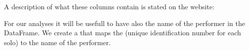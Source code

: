\documentclass[letterpaper,10pt,english]{sphinxmanual}
\begin{document}
A description of what these columns contain is stated on the website: 

For our analyses it will be usefull to have also the name of the performer in the  DataFrame. We create a  that maps the  (unique identification number for each solo) to the name of the performer.

{
\begin{sphinxVerbatim}[commandchars=\\\{\}]
\llap{\color{nbsphinxin}[26]:\,\hspace{\fboxrule}\hspace{\fboxsep}}   \PYG{p}{[}\PYG{p}{[} \PYG{p}{]}\PYG{p}{]} 
\end{sphinxVerbatim}
}
\end{document}
